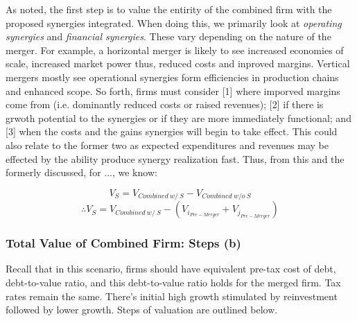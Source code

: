 \documentclass[11pt, english]{article}
\begin{document}
	As noted, the first step is to value the entirity of the combined firm with the proposed synergies integrated. When doing this, we primarily look at \textit{operating synergies} and \textit{financial synergies}. These vary depending on the nature of the merger. For example, a horizontal merger is likely to see increased economies of scale, increased market power thus, reduced costs and inproved margins. Vertical mergers mostly see operational synergies form efficiencies in production chains and enhanced scope. So forth, firms must consider [1] where imporved margins come from (i.e. dominantly reduced costs or raised revenues); [2] if there is grwoth potential to the synergies or if they are more immediately functional; and [3] when the costs and the gains synergies will begin to take effect. This could also relate to the former two as expected expenditures and revenues may be effected by the ability produce synergy realization fast. Thus, from this and the formerly discussed, for ..., we know:

	$$V_S=V_{Combined\ w/\ S}-V_{Combined\ w/o\ S}$$
	$$\therefore V_S=V_{Combined\ w/\ S}-(V_{i_{Pre-Merger}}+V_{j_{Pre-Merger}})$$

		\subsubsection*{Total Value of Combined Firm: Steps (b)}

	Recall that in this scenario, firms should have equivalent pre-tax cost of debt, debt-to-value ratio, and this debt-to-value ratio holds for the merged firm. Tax rates remain the same. There's initial high growth stimulated by reinvestment followed by lower growth. Steps of valuation are outlined below.
	
\end{document}
